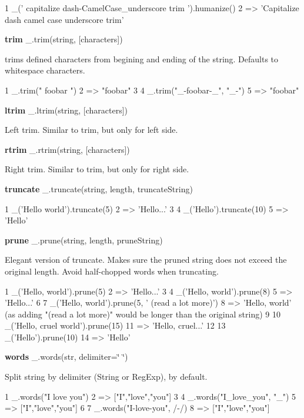 \begin{DoxyCode}
1 \_('  capitalize dash-CamelCase\_underscore trim  ').humanize()
2 => 'Capitalize dash camel case underscore trim'
\end{DoxyCode}


{\bfseries trim} \+\_\+.\+trim(string, \mbox{[}characters\mbox{]})

trims defined characters from begining and ending of the string. Defaults to whitespace characters.


\begin{DoxyCode}
1 \_.trim("  foobar   ")
2 => "foobar"
3 
4 \_.trim("\_-foobar-\_", "\_-")
5 => "foobar"
\end{DoxyCode}


{\bfseries ltrim} \+\_\+.\+ltrim(string, \mbox{[}characters\mbox{]})

Left trim. Similar to trim, but only for left side.

{\bfseries rtrim} \+\_\+.\+rtrim(string, \mbox{[}characters\mbox{]})

Right trim. Similar to trim, but only for right side.

{\bfseries truncate} \+\_\+.\+truncate(string, length, truncate\+String)


\begin{DoxyCode}
1 \_('Hello world').truncate(5)
2 => 'Hello...'
3 
4 \_('Hello').truncate(10)
5 => 'Hello'
\end{DoxyCode}


{\bfseries prune} \+\_\+.\+prune(string, length, prune\+String)

Elegant version of truncate. Makes sure the pruned string does not exceed the original length. Avoid half-\/chopped words when truncating.


\begin{DoxyCode}
1 \_('Hello, world').prune(5)
2 => 'Hello...'
3 
4 \_('Hello, world').prune(8)
5 => 'Hello...'
6 
7 \_('Hello, world').prune(5, ' (read a lot more)')
8 => 'Hello, world' (as adding "(read a lot more)" would be longer than the original string)
9 
10 \_('Hello, cruel world').prune(15)
11 => 'Hello, cruel...'
12 
13 \_('Hello').prune(10)
14 => 'Hello'
\end{DoxyCode}


{\bfseries words} \+\_\+.\+words(str, delimiter=\char`\"{} \char`\"{})

Split string by delimiter (String or Reg\+Exp), \textquotesingle{} \textquotesingle{} by default.


\begin{DoxyCode}
1 \_.words("I love you")
2 => ["I","love","you"]
3 
4 \_.words("I\_love\_you", "\_")
5 => ["I","love","you"]
6 
7 \_.words("I-love-you", /-/)
8 => ["I","love","you"]
\end{DoxyCode}


